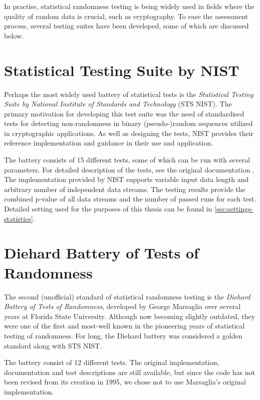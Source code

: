 \documentclass[12pt,twoside]{fithesis2}		%
\renewcommand{\_}{\leavevmode \kern0.0em\vbox{\hrule width0.4em}}
\begin{document}
\noindent
In practise, statistical randomness testing is being widely used in fields where the quality of random data is crucial, 
such as cryptography. To ease the assessment process, several testing suites have been developed, some of which are discussed below.

\section{Statistical Testing Suite by NIST}
\label{sec:sts-nist}

Perhaps the most widely used battery of statistical tests is the \textit{Statistical Testing Suite 
by National Institute of Standards and Technology} (STS NIST).
The primary motivation for developing this test suite was the need of standardised tests for detecting non-randomness 
in binary (pseudo-)random sequences utilized in cryptographic applications. As well as designing the tests,
NIST provides their reference implementation and guidance in their use and application. \parencite{sts-nist}

The battery consists of 15 different tests, some of which can be run with several parameters. 
For detailed description of the tests, see the original documentation \parencite{sts-nist-documentation}. 
The implementation provided by NIST supports variable input data length and arbitrary number of independent data streams. 
The testing results provide the combined p-value of all data streams and the number of passed runs for each test. 
Detailed setting used for the purposes of this thesis can be found in \autoref{sec:settings-statistics}.

\section{Diehard Battery of Tests of Randomness}
\label{sec:diehard}

The second (unofficial) standard of statistical randomness testing is the \textit{Diehard Battery of Tests of Randomness}, 
developed by George Marsaglia over several years at Florida State University. \parencite{diehard} 
Although now becoming slightly outdated, they were one of the first and most-well known 
in the pioneering years of statistical testing of randomness. 
For long, the Diehard battery was considered a golden standard along with STS NIST.

The battery consist of 12 different tests. The original implementation, documentation and test descriptions are still available,
but since the code has not been revised from its creation in 1995, we chose not to use Marsaglia's original implementation.
\end{document}
